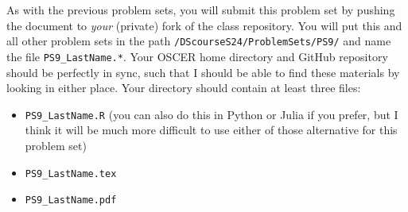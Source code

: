 \documentclass[12pt,english]{exam}
\begin{document}
As with the previous problem sets, you will submit this problem set by pushing the document to \emph{your} (private) fork of the class repository. You will put this and all other problem sets in the path \texttt{/DScourseS24/ProblemSets/PS9/} and name the file \texttt{PS9\_LastName.*}. Your OSCER home directory and GitHub repository should be perfectly in sync, such that I should be able to find these materials by looking in either place. Your directory should contain at least three files:
\begin{itemize}
    \item \texttt{PS9\_LastName.R} (you can also do this in Python or Julia if you prefer, but I think it will be much more difficult to use either of those alternative for this problem set)
    \item \texttt{PS9\_LastName.tex}
    \item \texttt{PS9\_LastName.pdf}
\end{itemize}
\end{document}
